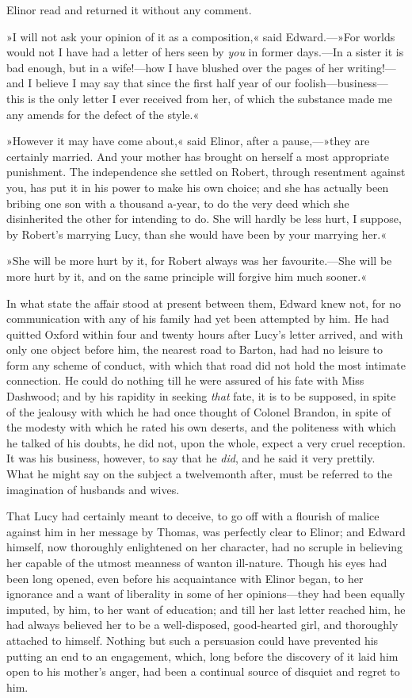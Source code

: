 Elinor read and returned it without any comment.

»I will not ask your opinion of it as a composition,« said Edward.—»For worlds would not I have had a letter of hers seen by \textit{you} in former days.—In a sister it is bad enough, but in a wife!—how I have blushed over the pages of her writing!—and I believe I may say that since the first half year of our foolish—business—this is the only letter I ever received from her, of which the substance made me any amends for the defect of the style.«

»However it may have come about,« said Elinor, after a pause,—»they are certainly married. And your mother has brought on herself a most appropriate punishment. The independence she settled on Robert, through resentment against you, has put it in his power to make his own choice; and she has actually been bribing one son with a thousand a-year, to do the very deed which she disinherited the other for intending to do. She will hardly be less hurt, I suppose, by Robert’s marrying Lucy, than she would have been by your marrying her.«

»She will be more hurt by it, for Robert always was her favourite.—She will be more hurt by it, and on the same principle will forgive him much sooner.«

In what state the affair stood at present between them, Edward knew not, for no communication with any of his family had yet been attempted by him. He had quitted Oxford within four and twenty hours after Lucy’s letter arrived, and with only one object before him, the nearest road to Barton, had had no leisure to form any scheme of conduct, with which that road did not hold the most intimate connection. He could do nothing till he were assured of his fate with Miss Dashwood; and by his rapidity in seeking \textit{that} fate, it is to be supposed, in spite of the jealousy with which he had once thought of Colonel Brandon, in spite of the modesty with which he rated his own deserts, and the politeness with which he talked of his doubts, he did not, upon the whole, expect a very cruel reception. It was his business, however, to say that he \textit{did}, and he said it very prettily. What he might say on the subject a twelvemonth after, must be referred to the imagination of husbands and wives.

That Lucy had certainly meant to deceive, to go off with a flourish of malice against him in her message by Thomas, was perfectly clear to Elinor; and Edward himself, now thoroughly enlightened on her character, had no scruple in believing her capable of the utmost meanness of wanton ill-nature. Though his eyes had been long opened, even before his acquaintance with Elinor began, to her ignorance and a want of liberality in some of her opinions—they had been equally imputed, by him, to her want of education; and till her last letter reached him, he had always believed her to be a well-disposed, good-hearted girl, and thoroughly attached to himself. Nothing but such a persuasion could have prevented his putting an end to an engagement, which, long before the discovery of it laid him open to his mother’s anger, had been a continual source of disquiet and regret to him.

